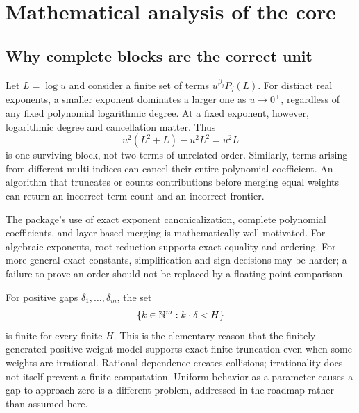 \section{Mathematical analysis of the core}
\subsection{Why complete blocks are the correct unit}
Let $L=\log u$ and consider a finite set of terms $u^{\beta_j}P_j(L)$. For distinct real exponents, a smaller exponent dominates a larger one as $u\to0^+$, regardless of any fixed polynomial logarithmic degree. At a fixed exponent, however, logarithmic degree and cancellation matter. Thus
\[
 u^2(L^2+L)-u^2L^2=u^2L
\]
is one surviving block, not two terms of unrelated order. Similarly, terms arising from different multi-indices can cancel their entire polynomial coefficient. An algorithm that truncates or counts contributions before merging equal weights can return an incorrect term count and an incorrect frontier.

The package's use of exact exponent canonicalization, complete polynomial coefficients, and layer-based merging is mathematically well motivated. For algebraic exponents, root reduction supports exact equality and ordering. For more general exact constants, simplification and sign decisions may be harder; a failure to prove an order should not be replaced by a floating-point comparison.\cite{core,incremental}

For positive gaps $\delta_1,\ldots,\delta_m$, the set
\[
 \{k\in\mathbb N^m:k\cdot\delta<H\}
\]
is finite for every finite $H$. This is the elementary reason that the finitely generated positive-weight model supports exact finite truncation even when some weights are irrational. Rational dependence creates collisions; irrationality does not itself prevent a finite computation. Uniform behavior as a parameter causes a gap to approach zero is a different problem, addressed in the roadmap rather than assumed here.

